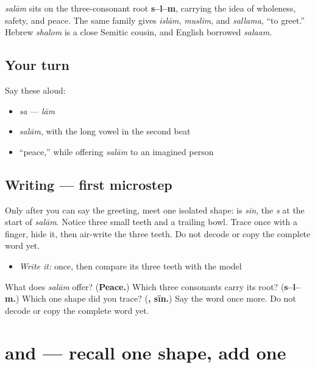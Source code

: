 \begin{cousinweb}
\emph{salām} sits on the three-consonant root \textbf{s–l–m}, carrying the idea of wholeness, safety, and peace. The same family gives \emph{islām}, \emph{muslim}, and \emph{sallama}, “to greet.” Hebrew \emph{shalom} is a close Semitic cousin, and English borrowed \emph{salaam}.
\end{cousinweb}

\subsection*{Your turn}
Say these aloud:

\begin{itemize}
\raggedright
  \item \emph{sa} — \emph{lām}
  \item \emph{salām}, with the long vowel in the second beat
  \item “peace,” while offering \emph{salām} to an imagined person
\end{itemize}

\subsection*{Writing — first microstep}
Only after you can say the greeting, meet one isolated shape: \textbf{} is \emph{sīn}, the \emph{s} at the start of \emph{salām}. Notice three small teeth and a trailing bowl. Trace \textbf{} once with a finger, hide it, then air-write the three teeth. Do not decode or copy the complete word yet.

\begin{itemize}
\raggedright
  \item \emph{Write it:} \textbf{} once, then compare its three teeth with the model
\end{itemize}

\begin{tcolorbox}[breakable,colback=teal!4,colframe=teal!35!black,title={Before you move on}]
What does \emph{salām} offer? (\textbf{Peace.}) Which three consonants carry its root? (\textbf{s–l–m.}) Which one shape did you trace? (\textbf{, sīn.}) Say the word once more. Do not decode or copy the complete word yet.
\end{tcolorbox}
\section[\texorpdfstring{\ar{س} \ar{ل} (sīn, lām)}{س ل (sīn, lām)}]{ and  — recall one shape, add one}

